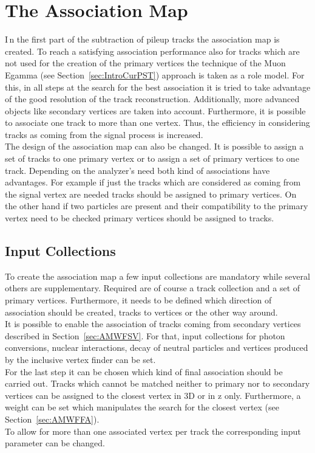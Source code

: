 \chapter{The Association Map \label{sec:AssMap}}

\lettrine[lines=2]{I}{\,}n the first part of the subtraction of pileup tracks the association map is created. To reach a satisfying association performance also for tracks which are not used for the creation of the primary vertices the technique of the Muon Egamma (see Section~\ref{sec:IntroCurPST}) approach is taken as a role model. For this, in all steps at the search for the best association it is tried to take advantage of the good resolution of the track reconstruction. Additionally, more advanced objects like secondary vertices are taken into account. Furthermore, it is possible to associate one track to more than one vertex. Thus, the efficiency in considering tracks as coming from the signal process is increased. \\
The design of the association map can also be changed. It is possible to assign a set of tracks to one primary vertex or to assign a set of primary vertices to one track. Depending on the analyzer's need both kind of associations have advantages. For example if just the tracks which are considered as coming from the signal vertex are needed tracks should be assigned to primary vertices. On the other hand if two particles are present and their compatibility to the primary vertex need to be checked primary vertices should be assigned to tracks.

\section{Input Collections \label{sec:AMInColl}}

To create the association map a few input collections are mandatory while several others are supplementary. Required are of course a track collection and a set of primary vertices. Furthermore, it needs to be defined which direction of association should be created, tracks to vertices or the other way around. \\ 
It is possible  to enable the association of tracks coming from secondary vertices described in Section~\ref{sec:AMWFSV}. For that, input collections for photon conversions, nuclear interactions, decay of neutral particles and vertices produced by the inclusive vertex finder can be set. \\
For the last step it can be chosen which kind of final association should be carried out. Tracks which cannot be matched neither to primary nor to secondary vertices can be assigned to the closest vertex in 3D or in z only. Furthermore, a weight can be set which manipulates the search for the closest vertex (see Section~\ref{sec:AMWFFA}). \\
To allow for more than one associated vertex per track the corresponding input parameter can be changed.


